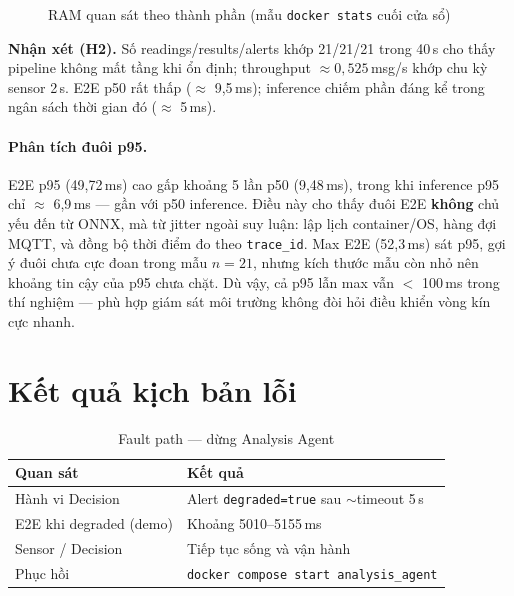 \documentclass[12pt,a4paper,oneside]{report}
\newcommand{\code}[1]{\texttt{#1}}
\begin{document}
\begin{figure}[htbp]
  \centering
  \caption{RAM quan sát theo thành phần (mẫu \texttt{docker stats} cuối cửa sổ)}
  \label{fig:ram-bar}
\end{figure}

\noindent\textbf{Nhận xét (H2).} Số readings/results/alerts khớp 21/21/21 trong 40\,s cho thấy pipeline không mất tầng khi ổn định; throughput $\approx 0{,}525$\,msg/s khớp chu kỳ sensor 2\,s. E2E p50 rất thấp ($\approx$ 9,5\,ms); inference chiếm phần đáng kể trong ngân sách thời gian đó ($\approx$ 5\,ms).

\paragraph{Phân tích đuôi p95.} E2E p95 (49,72\,ms) cao gấp khoảng 5 lần p50 (9,48\,ms), trong khi inference p95 chỉ $\approx$ 6,9\,ms --- gần với p50 inference. Điều này cho thấy đuôi E2E \textbf{không} chủ yếu đến từ ONNX, mà từ jitter ngoài suy luận: lập lịch container/OS, hàng đợi MQTT, và đồng bộ thời điểm đo theo \code{trace\_id}. Max E2E (52,3\,ms) sát p95, gợi ý đuôi chưa cực đoan trong mẫu $n=21$, nhưng kích thước mẫu còn nhỏ nên khoảng tin cậy của p95 chưa chặt. Dù vậy, cả p95 lẫn max vẫn $<$ 100\,ms trong thí nghiệm --- phù hợp giám sát môi trường không đòi hỏi điều khiển vòng kín cực nhanh.

\section{Kết quả kịch bản lỗi}

\begin{table}[htbp]
  \centering
  \caption{Fault path --- dừng Analysis Agent}
  \label{tab:fault}
  \begin{tabular}{p{5.0cm}p{8.0cm}}
    \toprule
    \textbf{Quan sát} & \textbf{Kết quả} \\
    \midrule
    Hành vi Decision & Alert \code{degraded=true} sau $\sim$timeout 5\,s \\
    E2E khi degraded (demo) & Khoảng 5010--5155\,ms \\
    Sensor / Decision & Tiếp tục sống và vận hành \\
    Phục hồi & \code{docker compose start analysis\_agent} \\
    \bottomrule
  \end{tabular}
\end{table}
\end{document}
